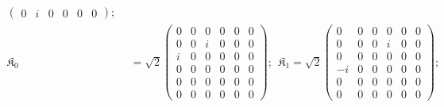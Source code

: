 \documentclass[aps,reprint,notitlepage,nofootinbib,superscriptaddress]{revtex4-1}
\begin{document}
\begin{align*}
\begin{pmatrix}
    0&i&0&0&0&0
    \end{pmatrix};~~\\
     \mathfrak{K}_0&=\sqrt{2}\begin{pmatrix}
    0&0&0&0&0&0\\
    0&0&i&0&0&0\\
    i&0&0&0&0&0\\
    0&0&0&0&0&0\\
    0&0&0&0&0&0\\
    0&0&0&0&0&0
    \end{pmatrix};~~\mathfrak{K}_1=\sqrt{2}\begin{pmatrix}
    0&0&0&0&0&0\\
    0&0&0&i&0&0\\
    0&0&0&0&0&0\\
    -i&0&0&0&0&0\\
    0&0&0&0&0&0\\
    0&0&0&0&0&0
    \end{pmatrix};~~
\end{align*}
\end{document}
